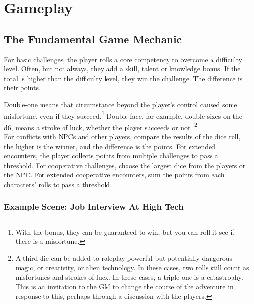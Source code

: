 \documentclass{LegrandOrangeTufteBook}
\newcommand{\term}[1]{\textcolor{colorTerm}{#1}}
\begin{document}
\chapterspaceabove{6.75cm}
\chapterspacebelow{11.25cm}


\chapter*{Gameplay}

\section*{The Fundamental Game Mechanic}

For basic challenges, the player rolls a \term{core competency} to overcome a \term{difficulty level}. Often, but not always, they add a \term{skill}, \term{talent} or \term{knowledge} bonus. If the total is higher than the \term{difficulty level}, they win the challenge. The difference is their \term{points}.\\

\marginpar{
	\footnotesize
	
}

Double-one means that circumstance beyond the player's control caused some \term{misfortune}, even if they succeed.\footnote{With the bonus, they can be guaranteed to win, but you can roll it see if there is a misfortune.} Double-face, for example, double sixes on the d6, means a \term{stroke of luck}, whether the player succeeds or not. \footnote{A third die can be added to roleplay powerful but potentially dangerous magic, or creativity, or alien technology. In these cases, two rolls still count as \term{misfortunes} and \term{strokes of luck}. In these cases, a triple one is a \term{catastrophy}. This is an invitation to the GM to change the course of the adventure in response to this, perhaps through a discussion with the players.}\\

For \term{conflicts} with NPCs and other players, compare the results of the dice roll, the higher is the winner, and the difference is the \term{points}. For \term{extended encounters}, the player collects \term{points} from multiple challenges to pass a threshold. For \term{cooperative challenges}, choose the largest dice from the players or the NPC. For \term{extended cooperative encounters}, sum the \term{points} from each characters' rolls to pass a threshold.

\subsection*{Example Scene: Job Interview At High Tech}
\end{document}
